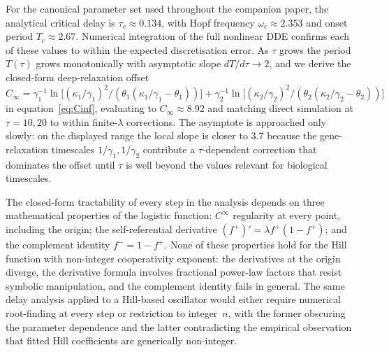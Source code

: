 \documentclass[sn-mathphys,Numbered]{sn-jnl}
\theoremstyle{thmstyleone}
\theoremstyle{thmstyletwo}
\theoremstyle{thmstylethree}
\begin{document}
For the canonical parameter set used throughout the companion paper, the
analytical critical delay is $\tau_c\approx 0.134$, with Hopf frequency
$\omega_c\approx 2.353$ and onset period $T_c\approx 2.67$. Numerical
integration of the full nonlinear DDE confirms each of these values to
within the expected discretisation error. As $\tau$ grows the period
$T(\tau)$ grows monotonically with asymptotic slope
$dT/d\tau\to 2$, and we derive the closed-form deep-relaxation offset
$C_\infty=\gamma_1^{-1}\ln\!\bigl[(\kappa_1/\gamma_1)^2/
(\theta_1(\kappa_1/\gamma_1-\theta_1))\bigr]
+\gamma_2^{-1}\ln\!\bigl[(\kappa_2/\gamma_2)^2/
(\theta_2(\kappa_2/\gamma_2-\theta_2))\bigr]$
in equation~\eqref{eq:Cinf}, evaluating to $C_\infty\approx 8.92$ and
matching direct simulation at $\tau=10,20$ to within finite-$\lambda$
corrections. The asymptote is approached only slowly: on the displayed
range the local slope is closer to $3.7$ because the gene-relaxation
timescales $1/\gamma_1, 1/\gamma_2$ contribute a $\tau$-dependent
correction that dominates the offset until $\tau$ is well beyond the
values relevant for biological timescales.

The closed-form tractability of every step in the analysis depends on
three mathematical properties of the logistic function:
$C^\infty$ regularity at every point, including the origin; the
self-referential derivative
$(f^+)'=\lambda f^+(1-f^+)$; and the complement identity
$f^-=1-f^+$. None of these properties hold for the Hill function with
non-integer cooperativity exponent: the derivatives at the origin
diverge, the derivative formula involves fractional power-law factors
that resist symbolic manipulation, and the complement identity fails
in general. The same delay analysis applied to a Hill-based oscillator
would either require numerical root-finding at every step or restriction
to integer~$n$, with the former obscuring the parameter dependence and
the latter contradicting the empirical observation that fitted Hill
coefficients are generically non-integer.
\end{document}
